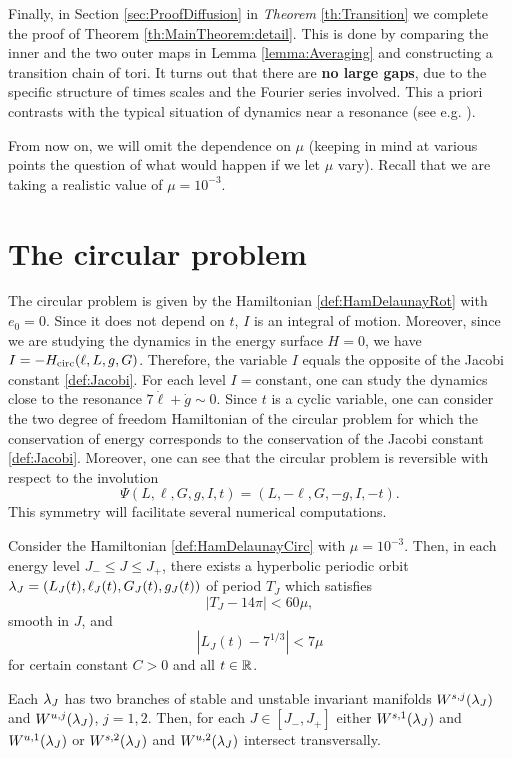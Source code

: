 Finally, in Section \ref{sec:ProofDiffusion} in {\it Theorem}
\ref{th:Transition} we complete the proof of Theorem
\ref{th:MainTheorem:detail}. This is done by comparing the inner and 
the two outer maps in Lemma \ref{lemma:Averaging} and constructing a
transition chain of tori.  It turns out that there are {\bf no large gaps}, 
due to the specific structure of times scales and the Fourier series involved. 
This a priori contrasts with the typical situation of
dynamics near a resonance (see e.g. \cite{DelshamsLS06a}).

\begin{notation}
  From now on, we will omit the dependence on $\mu$ (keeping in mind
  at various points the question of what would happen if we let $\mu$
  vary). Recall that we are taking a realistic value of $\mu=10^{-3}$.
\end{notation}

\section{The circular problem}\label{Section:Circular}

The circular problem is given by the Hamiltonian
\eqref{def:HamDelaunayRot} with $e_0=0$.  Since it does not depend on
$t$, $I$ is an integral of motion. Moreover, since we are studying the
dynamics in the energy surface $H=0$, we have $I=-H_{\mathrm{circ}}(\ell,L,g,G)$.
Therefore, the variable $I$ equals the opposite of the Jacobi constant \eqref{def:Jacobi}. For each level
$I=\text{constant}$, one can study the dynamics close to the resonance
$7\dot \ell+\dot g\sim 0$. Since $t$ is a cyclic variable, one can consider
the two degree of freedom Hamiltonian of the circular problem
for which the conservation of energy corresponds to the conservation of
the Jacobi constant \eqref{def:Jacobi}. Moreover, one can see that
the circular problem is reversible with respect to the involution
\begin{equation}\label{def:involution}
 \Psi(L,\ell,G, g,I,t)=(L,-\ell,G,-g,I,-t).
\end{equation}
This symmetry will facilitate several numerical computations.


\begin{theorem}\label{th:NHIMCircular}
  Consider the Hamiltonian \eqref{def:HamDelaunayCirc} with
  $\mu=10^{-3}$.  Then, in each energy level $J_-\leq J\leq J_+$,
  there exists a hyperbolic periodic orbit $\lambda_J=(L_J(t), \ell_J(t),
  G_J(t), g_J(t))$ of period $T_J$ which satisfies
  \[
  \left| T_J-14\pi\right|<60 \mu,
  \]
  smooth in $J$, and
  \[
  \left| L_J(t)-7^{1/3}\right|< 7\mu
  \]
  for certain constant $C>0$ and all $t\in\mathbb{R}$.

  Each $\lambda_J$ has two branches of stable and 
  unstable invariant manifolds $W^{s,j}(\lambda_J)$ 
  and $W^{u,j}(\lambda_J)$, $j=1,2$. Then, for each
  $J\in [J_-,J_+]$ either $W^{s,1}(\lambda_J)$ and 
  $W^{u,1}(\lambda_J)$ or $W^{s,2}(\lambda_J)$ and 
  $W^{u,2}(\lambda_J)$ intersect transversally.
\end{theorem}

